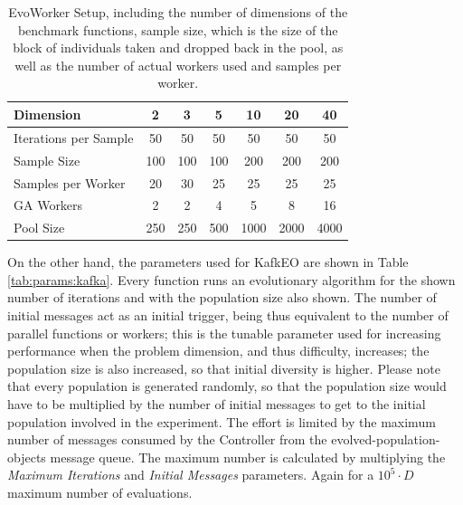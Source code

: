 \documentclass[sigconf]{acmart}
\begin{document}
\begin{table}
  \small
  \caption{EvoWorker Setup, including the number of dimensions of the
    benchmark functions, sample size, which is the size of the block
    of individuals taken and dropped back in the pool, as well as the
    number of actual workers used and samples per worker. }
  \label{tab:params:evoworkers} 
  \centering
  \small
  \begin{tabular}{|l|c|c|c|c|c|c|}
    \hline
    Dimension & 2 & 3 & 5 & 10 & 20 & 40\\ \hline
    Iterations per Sample  & 50 & 50 & 50 & 50 & 50 & 50\\ \hline
    Sample Size  & 100 & 100 & 100 & 200 & 200 & 200 \\ \hline
    Samples per Worker & 20 & 30 & 25 & 25 & 25 & 25  \\ \hline
    GA Workers & 2 & 2 & 4 & 5 & 8 & 16  \\ \hline
    Pool Size & 250 & 250 & 500 & 1000 & 2000 & 4000  \\ \hline
  \end{tabular}
\end{table}

On the other hand, the parameters used for KafkEO are shown in Table
\ref{tab:params:kafka}. Every function runs an evolutionary algorithm
for the shown number of iterations and with the population size also
shown. The number of initial messages act as an initial trigger, being
thus equivalent to the number of parallel functions or workers; this is the
tunable parameter used for increasing performance when the problem
dimension, and thus difficulty, increases; the population size is also
increased, so that initial diversity is higher. Please note that every
population is generated randomly, so that the population size would
have to be multiplied by the number of initial messages to get to the
initial population involved in the experiment. The effort is limited by the 
maximum number of messages consumed by the Controller from the  {\sf evolved-population-objects} message queue. The maximum number is calculated 
by multiplying the {\em  Maximum Iterations} and {\em Initial Messages} parameters. Again for a $10^5 \cdot D$ maximum number of evaluations.
\end{document}

